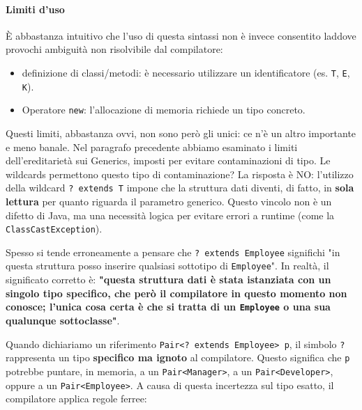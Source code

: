 \paragraph{Limiti d'uso}
È abbastanza intuitivo che l'uso di questa sintassi non è invece consentito laddove provochi ambiguità non risolvibile dal compilatore: 
\begin{itemize}
    \item definizione di classi/metodi: è necessario utilizzare un identificatore (es. \texttt{T}, \texttt{E}, \texttt{K}).
    \item Operatore \texttt{new}: l'allocazione di memoria richiede un tipo concreto.
\end{itemize}
\smallskip
Questi limiti, abbastanza ovvi, non sono però gli unici: ce n'è un altro importante e meno banale. Nel paragrafo precedente abbiamo esaminato i limiti dell'ereditarietà sui Generics, imposti per evitare contaminazioni di tipo. Le wildcards permettono questo tipo di contaminazione? La risposta è NO: l'utilizzo della wildcard \texttt{? extends T} impone che la struttura dati diventi, di fatto, in \textbf{sola lettura} per quanto riguarda il parametro generico. Questo vincolo non è un difetto di Java, ma una necessità logica per evitare errori a runtime (come la \texttt{ClassCastException}).

Spesso si tende erroneamente a pensare che \texttt{? extends Employee} significhi "in questa struttura posso inserire qualsiasi sottotipo di \texttt{Employee}". In realtà, il significato corretto è: \textbf{"questa struttura dati è stata istanziata con un singolo tipo specifico, che però il compilatore in questo momento non conosce; l'unica cosa certa è che si tratta di un \texttt{Employee} o una sua qualunque sottoclasse"}.

Quando dichiariamo un riferimento \texttt{Pair<? extends Employee> p}, il simbolo \texttt{?} rappresenta un tipo \textbf{specifico ma ignoto} al compilatore. Questo significa che \texttt{p} potrebbe puntare, in memoria, a un \texttt{Pair<Manager>}, a un \texttt{Pair<Developer>}, oppure a un \texttt{Pair<Employee>}. A causa di questa incertezza sul tipo esatto, il compilatore applica regole ferree:

